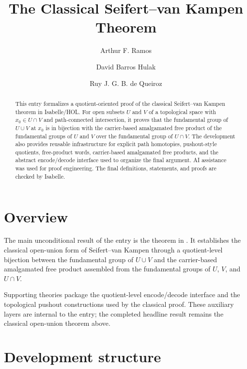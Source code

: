 \documentclass[11pt,a4paper]{article}
\begin{document}
\title{The Classical Seifert--van Kampen Theorem}
\author{Arthur F. Ramos \and David Barros Hulak \and Ruy J. G. B. de Queiroz}
\maketitle

\begin{abstract}
  This entry formalizes a quotient-oriented proof of the classical
  Seifert--van Kampen theorem in Isabelle/HOL. For open subsets $U$ and $V$ of
  a topological space with $x_0 \in U \cap V$ and path-connected intersection,
  it proves that the fundamental group of $U \cup V$ at $x_0$ is in bijection
  with the carrier-based amalgamated free product of the fundamental groups of
  $U$ and $V$ over the fundamental group of $U \cap V$. The development also
  provides reusable infrastructure for explicit path homotopies, pushout-style
  quotients, free-product words, carrier-based amalgamated free products, and
  the abstract encode/decode interface used to organize the final argument.
  AI assistance was used for proof engineering. The final definitions,
  statements, and proofs are checked by Isabelle.
\end{abstract}

\section{Overview}

The main unconditional result of the entry is the theorem
 in
. It establishes the classical
open-union form of Seifert--van Kampen through a quotient-level bijection
between the fundamental group of $U \cup V$ and the carrier-based amalgamated
free product assembled from the fundamental groups of $U$, $V$, and
$U \cap V$.

Supporting theories package the quotient-level encode/decode interface and the
topological pushout constructions used by the classical proof. These auxiliary
layers are internal to the entry; the completed headline result remains the
classical open-union theorem above.

\section{Development structure}
\end{document}
